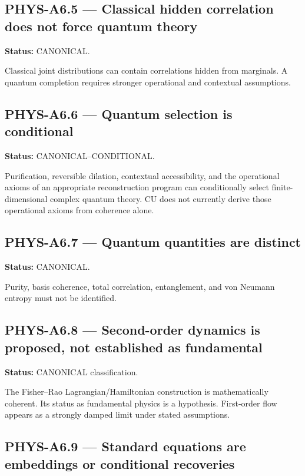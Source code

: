 \documentclass[
  11pt,
]{article}
\begin{document}
\subsection{PHYS-A6.5 --- Classical hidden correlation does not force
quantum
theory}\label{phys-a6.5-classical-hidden-correlation-does-not-force-quantum-theory}

\textbf{Status:} CANONICAL.

Classical joint distributions can contain correlations hidden from
marginals. A quantum completion requires stronger operational and
contextual assumptions.

\subsection{PHYS-A6.6 --- Quantum selection is
conditional}\label{phys-a6.6-quantum-selection-is-conditional}

\textbf{Status:} CANONICAL--CONDITIONAL.

Purification, reversible dilation, contextual accessibility, and the
operational axioms of an appropriate reconstruction program can
conditionally select finite-dimensional complex quantum theory. CU does
not currently derive those operational axioms from coherence alone.

\subsection{PHYS-A6.7 --- Quantum quantities are
distinct}\label{phys-a6.7-quantum-quantities-are-distinct}

\textbf{Status:} CANONICAL.

Purity, basis coherence, total correlation, entanglement, and von
Neumann entropy must not be identified.

\subsection{PHYS-A6.8 --- Second-order dynamics is proposed, not
established as
fundamental}\label{phys-a6.8-second-order-dynamics-is-proposed-not-established-as-fundamental}

\textbf{Status:} CANONICAL classification.

The Fisher--Rao Lagrangian/Hamiltonian construction is mathematically
coherent. Its status as fundamental physics is a hypothesis. First-order
flow appears as a strongly damped limit under stated assumptions.

\subsection{PHYS-A6.9 --- Standard equations are embeddings or
conditional
recoveries}\label{phys-a6.9-standard-equations-are-embeddings-or-conditional-recoveries}
\end{document}
